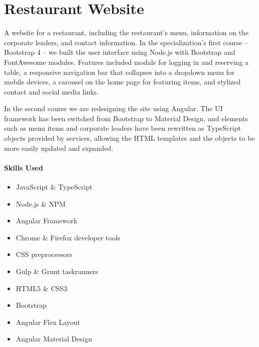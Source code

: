 \documentclass[12pt]{article}
\makeatletter
\newcommand\sectionsubtitle[1]{\def\@sectionsubtitle{#1}}
\makeatother
\begin{document}
\clearpage

\sectionsubtitle{Full Stack Web and Multiplatform Mobile App Development\\\vspace{-5pt}The Hong Kong University of Science and Technology through Coursera}
\section*{Restaurant Website}
\thispagestyle{plain}

A website for a restaurant, including the restaurant's menu, information on the corporate leaders, and contact information.  In the specialization's first course -- Bootstrap 4 -- we built the user interface using Node.js with Bootstrap and FontAwesome modules.  Features included modals for logging in and reserving a table, a responsive navigation bar that collapses into a dropdown menu for mobile devices, a carousel on the home page for featuring items, and stylized contact and social media links.

In the second course we are redesigning the site using Angular.  The UI framework has been switched from Bootstrap to Material Design, and elements such as menu items and corporate leaders have been rewritten as TypeScript objects provided by services, allowing the HTML templates and the objects to be more easily updated and expanded.  

\paragraph{Skills Used}
\begin{itemize}
\item JavaScript \& TypeScript
\item Node.js \& NPM
\item Angular Framework
\item Chrome \& Firefox developer tools
\item CSS preprocessors
\item Gulp \& Grunt taskrunners
\item HTML5 \& CSS3
\item Bootstrap
\item Angular Flex Layout
\item Angular Material Design
\end{itemize}

\end{document}
